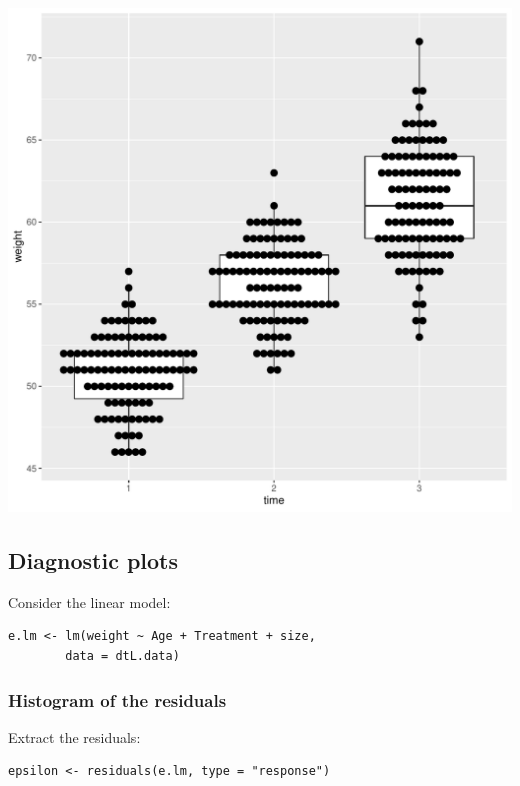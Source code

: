 \documentclass{article}
\begin{document}
\begin{center}
\includegraphics[width=.9\linewidth]{./figures/fig-hist.pdf}
\end{center}

\subsection{Diagnostic plots}
\label{sec:org5ce8b53}

Consider the linear model:
\lstset{language=r,label= ,caption= ,captionpos=b,numbers=none}
\begin{lstlisting}
e.lm <- lm(weight ~ Age + Treatment + size,
	    data = dtL.data)
\end{lstlisting}

\subsubsection{Histogram of the residuals}
\label{sec:org854e815}

Extract the residuals:
\lstset{language=r,label= ,caption= ,captionpos=b,numbers=none}
\begin{lstlisting}
epsilon <- residuals(e.lm, type = "response")
\end{lstlisting}
\end{document}
